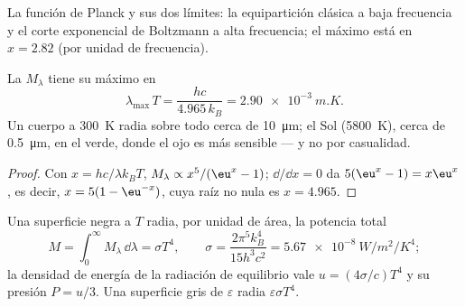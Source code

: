 \begin{omfigure}

{\small La función de Planck y sus dos límites: la equipartición clásica
a baja frecuencia y el corte exponencial de Boltzmann a alta frecuencia;
el máximo está en $x = 2.82$ (por unidad de frecuencia).}
\end{omfigure}

\begin{proposition}\label{prop:b2:thermal-radiation:wien}
La  $M_\lambda$ tiene su máximo en
\[
\lambda_{\max}\,T = \frac{hc}{4.965\,k_B} = \qty{2.90e-3}{m.K} .
\]
Un cuerpo a \qty{300}{K} radia sobre todo cerca de \qty{10}{\micro m}; el Sol
(\qty{5800}{K}), cerca de \qty{0.5}{\micro m}, en el verde, donde el ojo es
más sensible --- y no por casualidad.
\end{proposition}

\begin{proof}
Con $x = hc/\lambda k_BT$, $M_\lambda \propto x^5/(\eu^x - 1)$; $\dd/\dd x = 0$
da $5(\eu^x - 1) = x\eu^x$, es decir, $x = 5(1 - \eu^{-x})$, cuya raíz no
nula es $x = 4.965$.
\end{proof}

\begin{theorem}\label{thm:b2:thermal-radiation:stefan}
Una superficie negra a $T$ radia, por unidad de área, la potencia total
\[
M = \int_0^\infty M_\lambda\,\dd\lambda = \sigma T^4, \qquad
\sigma = \frac{2\pi^5k_B^4}{15h^3c^2} = \qty{5.67e-8}{W/m^2/K^4} ;
\]
la densidad de energía de la radiación de equilibrio vale $u = (4\sigma/c)T^4$
y su presión $P = u/3$. Una superficie gris de  $\varepsilon$
radia $\varepsilon\sigma T^4$.
\end{theorem}

